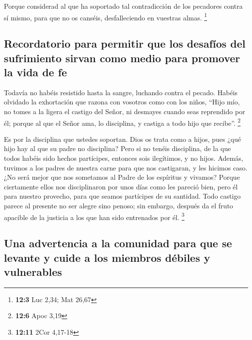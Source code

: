 \begin{paracol}{2}
 Porque considerad al que ha soportado tal contradicción
de los pecadores contra sí mismo, para que no os canséis, desfalleciendo
en vuestras almas. \footnote{\textbf{12:3} Luc 2,34; Mat 26,67}

\hypertarget{recordatorio-para-permitir-que-los-desafuxedos-del-sufrimiento-sirvan-como-medio-para-promover-la-vida-de-fe}{%
\subsection{Recordatorio para permitir que los desafíos del sufrimiento
sirvan como medio para promover la vida de
fe}\label{recordatorio-para-permitir-que-los-desafuxedos-del-sufrimiento-sirvan-como-medio-para-promover-la-vida-de-fe}}

 Todavía no habéis resistido hasta la sangre, luchando
contra el pecado.  Habéis olvidado la exhortación que
razona con vosotros como con los niños, ``Hijo mío, no tomes a la ligera
el castigo del Señor, ni desmayes cuando seas reprendido por él;
 porque al que el Señor ama, lo disciplina, y castiga a
todo hijo que recibe''. \footnote{\textbf{12:6} Apoc 3,19}

 Es por la disciplina que ustedes soportan. Dios os trata
como a hijos, pues ¿qué hijo hay al que su padre no disciplina?
 Pero si no tenéis disciplina, de la que todos habéis sido
hechos partícipes, entonces sois ilegítimos, y no hijos. 
Además, tuvimos a los padres de nuestra carne para que nos castigaran, y
les hicimos caso. ¿No será mejor que nos sometamos al Padre de los
espíritus y vivamos?  Porque ciertamente ellos nos
disciplinaron por unos días como les pareció bien, pero él para nuestro
provecho, para que seamos partícipes de su santidad. 
Todo castigo parece al presente no ser alegre sino penoso; sin embargo,
después da el fruto apacible de la justicia a los que han sido
entrenados por él. \footnote{\textbf{12:11} 2Cor 4,17-18}

\hypertarget{una-advertencia-a-la-comunidad-para-que-se-levante-y-cuide-a-los-miembros-duxe9biles-y-vulnerables}{%
\subsection{Una advertencia a la comunidad para que se levante y cuide a
los miembros débiles y
vulnerables}\label{una-advertencia-a-la-comunidad-para-que-se-levante-y-cuide-a-los-miembros-duxe9biles-y-vulnerables}}


\end{paracol}
